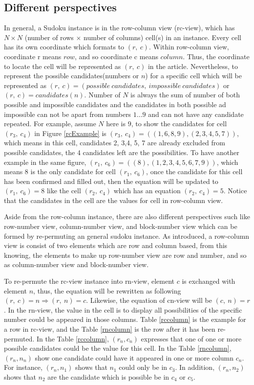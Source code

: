 \documentclass[11pt]{report}
\begin{document}
\subsection{Different  perspectives}
In general, a Sudoku instance is in the row-column view (rc-view), which has $N \times N$  (number of rows $\times$ number of columns) cell(s) in an instance. Every cell has its own coordinate which formats to $(r,\ c)$. Within row-column view, coordinate r means $row$, and so coordinate c means $column$. Thus, the coordinate to locate the cell will be represented as $(r,\ c)$ in the article. Nevertheless, to represent the possible candidates(numbers or $n$) for a specific cell which will be represented as $(r,\  c) = (possible\ candidates,\ impossible\ candidates)$ or $(r,\  c) = candidates(n)$. Number of $N$ is always the sum of number of both possible and impossible candidates and the candidates in both possible ad impossible can not be apart from numbers ${1 \dots 9}$ and can not have any candidate repeated. For example, assume $N$ here is $9$, to show the candidates for cell $(r_{3},\ c_{4})$ in Figure \ref{rcExample} is  $(r_{3},\ c_{4}) = ((1, 6, 8, 9), (2, 3, 4, 5, 7))$, which means in this cell, candidates 2, 3,4, 5, 7 are already excluded from possible candidates, the 4 candidates left are the possibilities. To have another example in the same figure, $(r_{1},\ c_{6}) = ((8), (1, 2, 3, 4, 5, 6, 7, 9))$, which means 8 is the only candidate for cell $(r_{1},\ c_{6})$, once the candidate for this cell has been confirmed and filled out, then the equation will be updated to $(r_{1},\ c_{6}) = 8$ like the cell $(r_{2},\ c_{4})$ which has an equation $(r_{2},\ c_{4}) = 5$. Notice that the candidates in the cell are the values for cell in row-column view.

Aside from the row-column instance, there are also different perspectives such like row-number view, column-number view, and  block-number view which can be formed by re-permuting an general sudoku instance. As introduced, a row-column view is consist of two elements which are row and column based, from this knowing, the elements to make up row-number view are row and number, and so as column-number view and block-number view. 

To re-permute the rc-view instance into rn-view, element $c$ is exchanged with element $n$, thus, the equation will be rewritten as following $(r,\ c) = n \Rightarrow (r,\ n) = c$. Likewise, the equation of cn-view will be $(c,\ n) = r$. In the rn-view, the value in the cell is to display all possibilities of the specific number could be appeared in those columns. Table \ref{rccolumn} is the example for a row in rc-view, and the Table \ref{rncolumn} is the row after it has been re-permuted. In the Table \ref{rccolumn}, $(r_{n}, c_{n})$ expresses that one of one or more possible candidates could be the value for this cell. In the Table \ref{rncolumn}, $(r_{n}, n_{n})$ show one candidate could have it appeared in one or more column $c_{n}$. For instance, $(r_{n}, n_{1})$ shows that $n_{1}$ could only be in $c_{3}$. In addition, $(r_{n}, n_{2})$ shows that $n_{2}$ are the candidate which is possible be in $c_{4}$ or $c_{5}$. 
\end{document}
